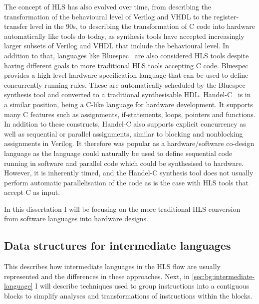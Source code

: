 The concept of \gls{HLS} has also evolved over time, from describing the
transformation of the behavioural level of Verilog and VHDL to the
register-transfer level in the 90s, to describing the transformation of C code
into hardware automatically like tools do today, as synthesis tools have
accepted increasingly larger subsets of Verilog and VHDL that include the
behavioural level.  In addition to that, languages like
Bluespec~\cite{nikhil04_bsv} are also considered \gls{HLS} tools despite having
different goals to more traditional \gls{HLS} tools accepting C code.  Bluespec
provides a high-level hardware specification language that can be used to define
concurrently running rules.  These are automatically scheduled by the Bluespec
synthesis tool and converted to a traditional synthesisable \gls{HDL}.
Handel-C~\cite{aubury96_handel_c_languag_refer_guide,bowen98_hclrm} is in a
similar position, being a C-like language for hardware development.  It supports
many C features such as assignments, if-statements, loops, pointers and
functions.  In addition to these constructs, Handel-C also supports explicit
concurrency as well as sequential or parallel assignments, similar to blocking
and nonblocking assignments in Verilog.  It therefore was popular as a
hardware/software co-design language as the language could naturally be used to
define sequential code running in software and parallel code which could be
synthesised to hardware.  However, it is inherently timed, and the Handel-C
synthesis tool does not usually perform automatic parallelisation of the code as
is the case with \gls{HLS} tools that accept C as input.

In this dissertation I will be focusing on the more traditional \gls{HLS}
conversion from software languages into hardware designs.

\subsection{Data structures for intermediate languages}%
\label{sec:bg:data-structures-for-intermediate-languages}

This  describes how
intermediate languages in the \gls{HLS} flow are usually represented and the
differences in these approaches.  Next, in \cref{sec:bg:intermediate-language} I
will describe techniques used to group instructions into a contiguous blocks to
simplify analyses and transformations of instructions within the blocks.

